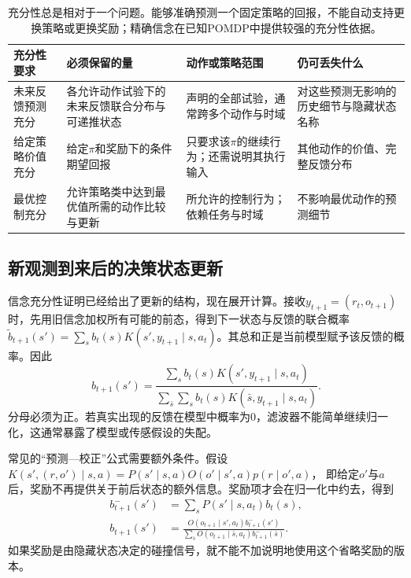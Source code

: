 \begin{table}[htbp]
  \centering
  \small
  \begin{tabularx}{\linewidth}{p{25mm}XXX}
    \toprule
    充分性要求 & 必须保留的量 & 动作或策略范围 & 仍可丢失什么 \\
    \midrule
    未来反馈预测充分 & 各允许动作试验下的未来反馈联合分布与可递推状态 & 声明的全部试验，通常跨多个动作与时域 & 对这些预测无影响的历史细节与隐藏状态名称 \\
    给定策略价值充分 & 给定$\pi$和奖励下的条件期望回报 & 只要求该$\pi$的继续行为；还需说明其执行输入 & 其他动作的价值、完整反馈分布 \\
    最优控制充分 & 允许策略类中达到最优值所需的动作比较与更新 & 所允许的控制行为；依赖任务与时域 & 不影响最优动作的预测细节 \\
    \bottomrule
  \end{tabularx}
  \caption{充分性总是相对于一个问题。能够准确预测一个固定策略的回报，不能自动支持更换策略或更换奖励；精确信念在已知POMDP中提供较强的充分性依据。}
  \label{tab:rl-information-sufficiency}
\end{table}

\subsection{新观测到来后的决策状态更新}
\label{sec:rl-information-filtering}

信念充分性证明已经给出了更新的结构，现在展开计算。接收$y_{t+1}=(r_t,o_{t+1})$时，先用旧信念加权所有可能的前态，得到下一状态与反馈的联合概率
$\widetilde b_{t+1}(s')=\sum_s b_t(s)K(s',y_{t+1}\mid s,a_t)$。其总和正是当前模型赋予该反馈的概率。因此
\begin{equation}
  \label{eq:rl-information-bayes}
  b_{t+1}(s')
  =\frac{\sum_s b_t(s)K(s',y_{t+1}\mid s,a_t)}
         {\sum_{\bar s}\sum_s b_t(s)K(\bar s,y_{t+1}\mid s,a_t)}.
\end{equation}
分母必须为正。若真实出现的反馈在模型中概率为0，滤波器不能简单继续归一化，这通常暴露了模型或传感假设的失配。

常见的“预测—校正”公式需要额外条件。假设
$K(s',(r,o')\mid s,a)=P(s'\mid s,a)O(o'\mid s',a)p(r\mid o',a)$，
即给定$o'$与$a$后，奖励不再提供关于前后状态的额外信息。奖励项才会在归一化中约去，得到
\begin{align}
  \label{eq:rl-information-predict-correct}
  b_{t+1}^{-}(s')&=\sum_sP(s'\mid s,a_t)b_t(s),\\
  b_{t+1}(s')&=
  \frac{O(o_{t+1}\mid s',a_t)b_{t+1}^{-}(s')}
       {\sum_{\bar s}O(o_{t+1}\mid\bar s,a_t)b_{t+1}^{-}(\bar s)}.
  \nonumber
\end{align}
如果奖励是由隐藏状态决定的碰撞信号，就不能不加说明地使用这个省略奖励的版本。

